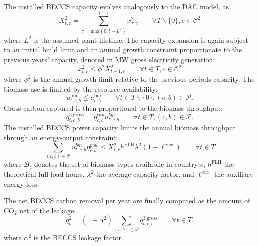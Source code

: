 The installed BECCS capacity evolves analogously to the DAC model, as
\begin{equation}
X_{t,c}^2 = \sum^{t-1}_{\tau=\text{max}(0,t-L^2)} x_{\tau,c}^2    \qquad \forall T \backslash\{ 0 \}, c \in \mathcal{C}^2
\end{equation}
where $L^2$ is the assumed plant lifetime. The capacity expansion is again subject to an initial build limit and an annual growth constraint proportionate to the previous years' capacity, denoted in MW gross electricity generation:
\begin{equation}
x_{t,c}^2 \leq
      \phi^2X_{t-1,c}^2 \qquad \forall t \in T, c \in \mathcal{C}^2
\end{equation}
where $\phi^2$ is the annual growth limit relative to the previous periods capacity. The biomass use is limited by the resource availability:
\begin{equation}
u_{t,c,b}^\text{bm} \leq a_{c,b}^\text{bm} \qquad \forall t \in T \backslash\{ 0 \}, (c,b) \in \mathcal{P}.
\end{equation}
Gross carbon captured is then proportional to the biomass throughput:
\begin{equation}
q_{t,c,b}^\text{3,gross} = \eta_{c,b}^{cap}u_{t,c,b}^{bm} \qquad \forall t \in T, (c,b) \in \mathcal{P}.
\end{equation}
The installed BECCS power capacity limits the annual biomass throughput through an energy-output constraint:
\begin{equation}
\sum_{(c,b)\in \mathcal{P}} u_{t,c,b}^{bm}\eta_{c,b}^{pow} \leq X_{t,c}^2h^\text{FLH}\lambda^{2}(1-\ell^{aux})  \qquad \forall t \in T
\end{equation}
where $\mathcal{B}_c$ denotes the set of biomass types availabile in country $c$, $h^\text{FLH}$ the theoretical full-load hours, $\lambda^2$ the average capacity factor, and $\ell^{aux}$ the auxiliary energy loss.\vspace{2mm}

The net BECCS carbon removal per year are finally computed as the amount of CO$_2$ net of the leakage:
\begin{equation}
q_{t}^2 = (1-\alpha^2) \sum_{(c,b)\in \mathcal{P}}q_{t,c,b}^\text{3,gross} \qquad \forall t \in T.
\end{equation}
where $\alpha^2$ is the BECCS leakage factor.\vspace{2mm}

